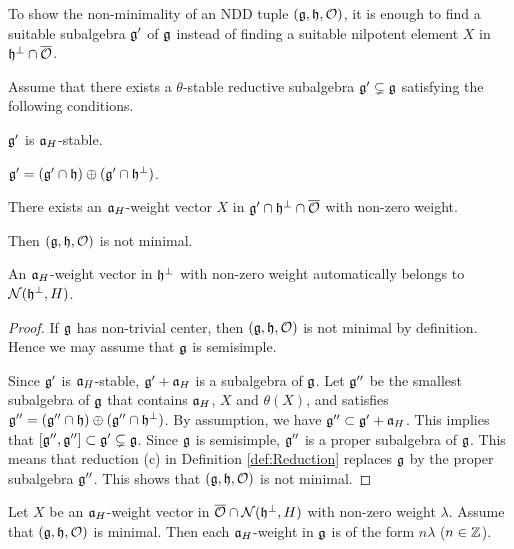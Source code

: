 To show the non-minimality of an NDD tuple $(\mathfrak{g}, \mathfrak{h}, \mathcal{O})$, it is enough to find a suitable subalgebra $\mathfrak{g}'$ of $\mathfrak{g}$ instead of finding a suitable nilpotent element $X$ in $\mathfrak{h}^\perp \cap \overline{\mathcal{O}}$.

\begin{proposition} \label{prop:NonMinimalSubalgebra}
	Assume that there exists a $\theta$-stable reductive subalgebra $\mathfrak{g}'\subsetneq \mathfrak{g}$ satisfying the following conditions.
	\begin{enumparen}
		\item $\mathfrak{g}'$ is $\mathfrak{a}_H$-stable.
		\item $\mathfrak{g}' = (\mathfrak{g}' \cap \mathfrak{h}) \oplus (\mathfrak{g}' \cap \mathfrak{h}^\perp)$.
		\item There exists an $\mathfrak{a}_H$-weight vector $X$ in $\mathfrak{g}' \cap \mathfrak{h}^\perp \cap \overline{\mathcal{O}}$ with non-zero weight.
	\end{enumparen}
	Then $(\mathfrak{g}, \mathfrak{h}, \mathcal{O})$ is not minimal.
\end{proposition}

\begin{remark}
	An $\mathfrak{a}_H$-weight vector in $\mathfrak{h}^\perp$ with non-zero weight automatically belongs to $\mathcal{N}(\mathfrak{h}^\perp, H)$.
\end{remark}

\begin{proof}
	If $\mathfrak{g}$ has non-trivial center, then $(\mathfrak{g}, \mathfrak{h}, \mathcal{O})$ is not minimal by definition.
	Hence we may assume that $\mathfrak{g}$ is semisimple.

	Since $\mathfrak{g}'$ is $\mathfrak{a}_H$-stable, $\mathfrak{g}' + \mathfrak{a}_H$ is a subalgebra of $\mathfrak{g}$.
	Let $\mathfrak{g}''$ be the smallest subalgebra of $\mathfrak{g}$ that contains $\mathfrak{a}_H$, $X$ and $\theta(X)$, and satisfies $\mathfrak{g}'' = (\mathfrak{g}''\cap \mathfrak{h}) \oplus (\mathfrak{g}''\cap \mathfrak{h}^\perp)$.
	By assumption, we have $\mathfrak{g}'' \subset \mathfrak{g}' + \mathfrak{a}_H$.
	This implies that $[\mathfrak{g}'', \mathfrak{g}''] \subset \mathfrak{g}' \subsetneq \mathfrak{g}$.
	Since $\mathfrak{g}$ is semisimple, $\mathfrak{g}''$ is a proper subalgebra of $\mathfrak{g}$.
	This means that reduction (c) in Definition \ref{def:Reduction} replaces $\mathfrak{g}$ by the proper subalgebra $\mathfrak{g}''$.
	This shows that $(\mathfrak{g}, \mathfrak{h}, \mathcal{O})$ is not minimal.
\end{proof}

\begin{corollary} \label{cor:MinimalGeneratedBy}
	Let $X$ be an $\mathfrak{a}_H$-weight vector in $\overline{\mathcal{O}} \cap \mathcal{N}(\mathfrak{h}^\perp, H)$ with non-zero weight $\lambda$.
	Assume that $(\mathfrak{g}, \mathfrak{h}, \mathcal{O})$ is minimal.
	Then each $\mathfrak{a}_H$-weight in $\mathfrak{g}$ is of the form $n\lambda$ ($n \in \mathbb{Z}$).
\end{corollary}

